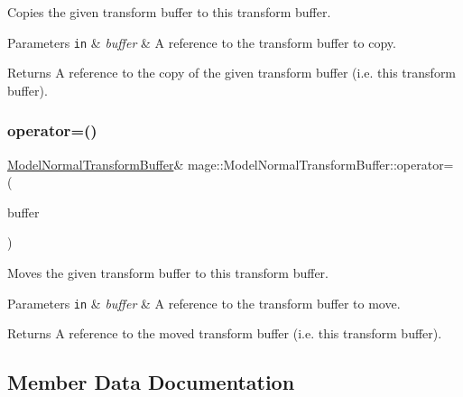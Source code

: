 Copies the given transform buffer to this transform buffer.


\begin{DoxyParams}[1]{Parameters}
\mbox{\tt in}  & {\em buffer} & A reference to the transform buffer to copy. \\
\hline
\end{DoxyParams}
\begin{DoxyReturn}{Returns}
A reference to the copy of the given transform buffer (i.\+e. this transform buffer). 
\end{DoxyReturn}
\hypertarget{structmage_1_1_model_normal_transform_buffer_acc27af2e1e65994a43e1d804aa25bb5a}{}\label{structmage_1_1_model_normal_transform_buffer_acc27af2e1e65994a43e1d804aa25bb5a} 
\subsubsection{\texorpdfstring{operator=()}{operator=()}\hspace{0.1cm}{\footnotesize\ttfamily [2/2]}}
{\footnotesize\ttfamily \hyperlink{structmage_1_1_model_normal_transform_buffer}{Model\+Normal\+Transform\+Buffer}\& mage\+::\+Model\+Normal\+Transform\+Buffer\+::operator= (\begin{DoxyParamCaption}\item[{\hyperlink{structmage_1_1_model_normal_transform_buffer}{Model\+Normal\+Transform\+Buffer} \&\&}]{buffer }\end{DoxyParamCaption})\hspace{0.3cm}{\ttfamily [default]}}

Moves the given transform buffer to this transform buffer.


\begin{DoxyParams}[1]{Parameters}
\mbox{\tt in}  & {\em buffer} & A reference to the transform buffer to move. \\
\hline
\end{DoxyParams}
\begin{DoxyReturn}{Returns}
A reference to the moved transform buffer (i.\+e. this transform buffer). 
\end{DoxyReturn}


\subsection{Member Data Documentation}
\hypertarget{structmage_1_1_model_normal_transform_buffer_a1d79f8570b8bc020406e007f30bcfb13}{}\label{structmage_1_1_model_normal_transform_buffer_a1d79f8570b8bc020406e007f30bcfb13} 
